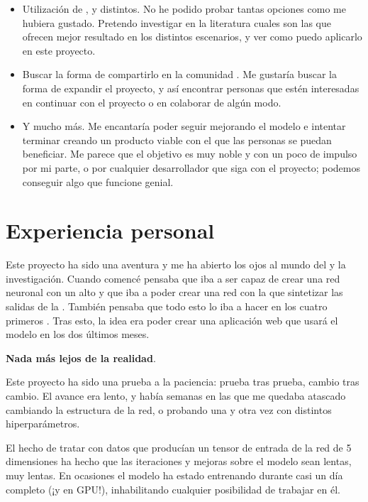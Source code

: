 \begin{itemize}
  \item Utilización de ,  y  distintos. No he podido probar tantas opciones como me hubiera gustado. Pretendo investigar en la literatura cuales son las que ofrecen mejor resultado en los distintos escenarios, y ver como puedo aplicarlo en este proyecto.

  \item Buscar la forma de compartirlo en la comunidad . Me gustaría buscar la forma de expandir el proyecto, y así encontrar personas que estén interesadas en continuar con el proyecto o en colaborar de algún modo.

  \item Y mucho más. Me encantaría poder seguir mejorando el modelo e intentar terminar creando un producto viable con el que las personas se puedan beneficiar. Me parece que el objetivo es muy noble y con un poco de impulso por mi parte, o por cualquier desarrollador que siga con el proyecto; podemos conseguir algo que funcione genial.
\end{itemize}


\section{Experiencia personal}

Este proyecto ha sido una aventura y me ha abierto los ojos al mundo del  y la investigación. Cuando comencé pensaba que iba a ser capaz de crear una red neuronal con un  alto y que iba a poder crear una red  con la que sintetizar las salidas de la . También pensaba que todo esto lo iba a hacer en los cuatro primeros . Tras esto, la idea era poder crear una aplicación web que usará el modelo en los dos últimos meses.

\textbf{Nada más lejos de la realidad}.

Este proyecto ha sido una prueba a la paciencia: prueba tras prueba, cambio tras cambio. El avance era lento, y había semanas en las que me quedaba atascado cambiando la estructura de la red, o probando una y otra vez con distintos hiperparámetros.

El hecho de tratar con datos que producían un tensor de entrada de la red de 5 dimensiones ha hecho que las iteraciones y mejoras sobre el modelo sean lentas, muy lentas. En ocasiones el modelo ha estado entrenando durante casi un día completo (¡y en GPU!), inhabilitando cualquier posibilidad de trabajar en él.

